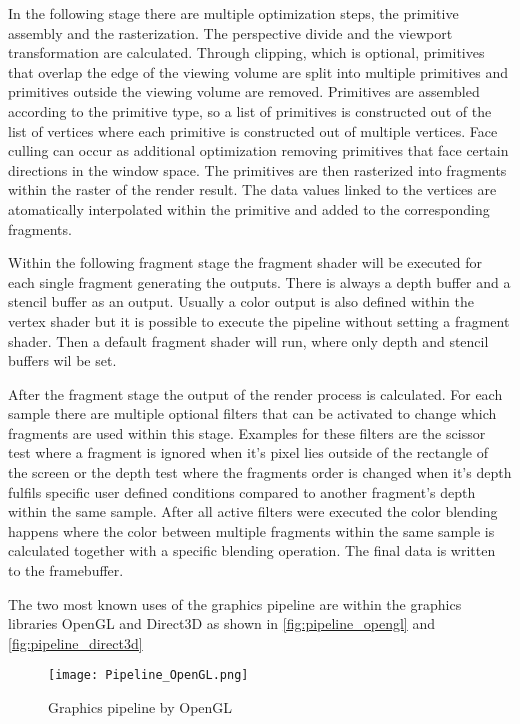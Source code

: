 In the following stage there are multiple optimization steps, the primitive assembly and the rasterization. The perspective divide and the viewport transformation are calculated. Through clipping, which is optional, primitives that overlap the edge of the viewing volume are split into multiple primitives and primitives outside the viewing volume are removed. Primitives are assembled according to the primitive type, so a list of primitives is constructed out of the list of vertices where each primitive is constructed out of multiple vertices. Face culling can occur as additional optimization removing primitives that face certain directions in the window space. The primitives are then rasterized into fragments within the raster of the render result. The data values linked to the vertices are atomatically interpolated within the primitive and added to the corresponding fragments.

Within the following fragment stage the fragment shader will be executed for each single fragment generating the outputs. There is always a depth buffer and a stencil buffer as an output. Usually a color output is also defined within the vertex shader but it is possible to execute the pipeline without setting a fragment shader. Then a default fragment shader will run, where only depth and stencil buffers wil be set.

After the fragment stage the output of the render process is calculated. For each sample there are multiple optional filters that can be activated to change which fragments are used within this stage. Examples for these filters are the scissor test where a fragment is ignored when it's pixel lies outside of the rectangle of the screen or the depth test where the fragments order is changed when it's depth fulfils specific user defined conditions compared to another fragment's depth within the same sample. After all active filters were executed the color blending happens where the color between multiple fragments within the same sample is calculated together with a specific blending operation. The final data is written to the framebuffer.

The two most known uses of the graphics pipeline are within the graphics libraries OpenGL and Direct3D as shown in  \autoref{fig:pipeline_opengl} and \autoref{fig:pipeline_direct3d}

\begin{figure}[h!]
  \centering 
  \texttt{[image: Pipeline\_OpenGL.png]}
  \caption[Graphics pipeline by OpenGL ]{Graphics pipeline by OpenGL}
  \label{fig:pipeline_opengl}
\end{figure}

